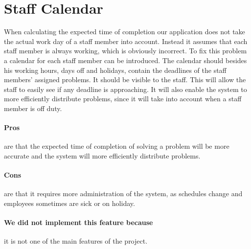 \section{Staff Calendar}
\label{sec:staffCalendar}
When calculating the expected time of completion our application does not take the actual work day of a staff member into account. 
Instead it assumes that each staff member is always working, which is obviously incorrect. 
To fix this problem a calendar for each staff member can be introduced. 
The calendar should besides his working hours, days off and holidays, contain the deadlines of the staff members' assigned problems. 
It should be visible to the staff. 
This will allow the staff to easily see if any deadline is approaching. 
It will also enable the system to more efficiently distribute problems, since it will take into account when a staff member is off duty. 

\paragraph{Pros} are that the expected time of completion of solving a problem will be more accurate and the system will more efficiently distribute problems.
\paragraph{Cons} are that it requires more administration of the system, as schedules change and employees sometimes are sick or on holiday.
\paragraph{We did not implement this feature because} it is not one of the main features of the project.